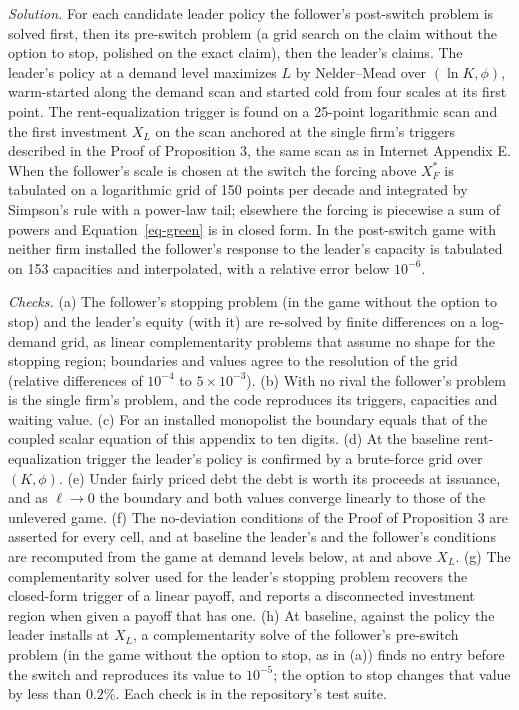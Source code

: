 \documentclass[
  11pt,
  letterpaper,
]{scrartcl}
\begin{document}
\emph{Solution.} For each candidate leader policy the follower's
post-switch problem is solved first, then its pre-switch problem (a grid
search on the claim without the option to stop, polished on the exact
claim), then the leader's claims. The leader's policy at a demand level
maximizes \(L\) by Nelder--Mead over \((\ln K, \phi)\), warm-started
along the demand scan and started cold from four scales at its first
point. The rent-equalization trigger is found on a 25-point logarithmic
scan and the first investment \(X_L\) on the scan anchored at the single
firm's triggers described in the Proof of Proposition 3, the same scan
as in Internet Appendix E. When the follower's scale is chosen at the
switch the forcing above \(X_F^*\) is tabulated on a logarithmic grid of
150 points per decade and integrated by Simpson's rule with a power-law
tail; elsewhere the forcing is piecewise a sum of powers and
Equation~\ref{eq-green} is in closed form. In the post-switch game with
neither firm installed the follower's response to the leader's capacity
is tabulated on 153 capacities and interpolated, with a relative error
below \(10^{-6}\).

\emph{Checks.} (a) The follower's stopping problem (in the game without
the option to stop) and the leader's equity (with it) are re-solved by
finite differences on a log-demand grid, as linear complementarity
problems that assume no shape for the stopping region; boundaries and
values agree to the resolution of the grid (relative differences of
\(10^{-4}\) to \(5 \times 10^{-3}\)). (b) With no rival the follower's
problem is the single firm's problem, and the code reproduces its
triggers, capacities and waiting value. (c) For an installed monopolist
the boundary equals that of the coupled scalar equation of this appendix
to ten digits. (d) At the baseline rent-equalization trigger the
leader's policy is confirmed by a brute-force grid over \((K, \phi)\).
(e) Under fairly priced debt the debt is worth its proceeds at issuance,
and as \(\ell \to 0\) the boundary and both values converge linearly to
those of the unlevered game. (f) The no-deviation conditions of the
Proof of Proposition 3 are asserted for every cell, and at baseline the
leader's and the follower's conditions are recomputed from the game at
demand levels below, at and above \(X_L\). (g) The complementarity
solver used for the leader's stopping problem recovers the closed-form
trigger of a linear payoff, and reports a disconnected investment region
when given a payoff that has one. (h) At baseline, against the policy
the leader installs at \(X_L\), a complementarity solve of the
follower's pre-switch problem (in the game without the option to stop,
as in (a)) finds no entry before the switch and reproduces its value to
\(10^{-5}\); the option to stop changes that value by less than
\(0.2\%\). Each check is in the repository's test suite.
\end{document}
